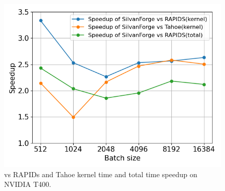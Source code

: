 
\begin{figure}[htb]
  \centering
  \includegraphics[width=0.75\linewidth]{figures/geomean_speedup_T400_kernel_time.png}
  \caption{\Treebeard{} vs RAPIDs and Tahoe kernel time and total time speedup on NVIDIA T400.}
  \label{Fig:TBvsRAPIDsTahoe_T400_Speedup}
\end{figure}

